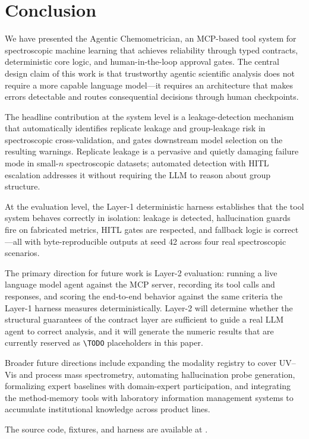 
\section{Conclusion}
\label{sec:conclusion}

We have presented the Agentic Chemometrician, an MCP-based tool system for
spectroscopic machine learning that achieves reliability through typed
contracts, deterministic core logic, and human-in-the-loop approval gates.
The central design claim of this work is that trustworthy agentic scientific
analysis does not require a more capable language model---it requires an
architecture that makes errors detectable and routes consequential decisions
through human checkpoints.

The headline contribution at the system level is a leakage-detection
mechanism that automatically identifies replicate leakage and group-leakage
risk in spectroscopic cross-validation, and gates downstream model selection
on the resulting warnings.
Replicate leakage is a pervasive and quietly damaging failure mode in
small-$n$ spectroscopic datasets; automated detection with HITL escalation
addresses it without requiring the LLM to reason about group structure.

At the evaluation level, the Layer-1 deterministic harness establishes
that the tool system behaves correctly in isolation: leakage is detected,
hallucination guards fire on fabricated metrics, HITL gates are respected,
and fallback logic is correct---all with byte-reproducible outputs at seed
42 across four real spectroscopic scenarios.

The primary direction for future work is Layer-2 evaluation: running a
live language model agent against the MCP server, recording its tool calls
and responses, and scoring the end-to-end behavior against the same
criteria the Layer-1 harness measures deterministically.
Layer-2 will determine whether the structural guarantees of the contract
layer are sufficient to guide a real LLM agent to correct analysis, and
it will generate the numeric results that are currently reserved as
\texttt{\textbackslash TODO} placeholders in this paper.

Broader future directions include expanding the modality registry to cover
UV--Vis and process mass spectrometry, automating hallucination probe
generation, formalizing expert baselines with domain-expert participation,
and integrating the method-memory tools with laboratory information
management systems to accumulate institutional knowledge across product lines.

The source code, fixtures, and harness are available at
.
